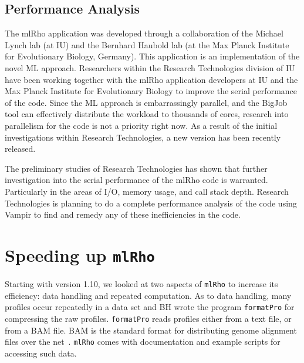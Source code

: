 \documentclass{sig-alternate}
\newcommand{\ty}{\texttt}
\begin{document}
\subsection{Performance Analysis}\label{subsec:analysis}
The mlRho application was developed through a collaboration of the Michael Lynch lab (at IU) and the Bernhard
Haubold lab (at the Max Planck Institute for Evolutionary Biology, Germany). This application is an implementation of
the novel ML approach. Researchers within the Research Technologies division of IU have been working together
with the mlRho application developers at IU and the Max Planck Institute for Evolutionary Biology to improve
the serial performance of the code. Since the ML approach is embarrassingly parallel, and the BigJob tool can
effectively distribute the workload to thousands of cores, research into parallelism for the code is not a priority right now. As a result of the initial investigations within Research Technologies, a new version has been recently released. 

The preliminary studies of Research Technologies has shown that further investigation into the serial
performance of the mlRho code is warranted. Particularly in the areas of I/O, memory usage, and call stack
depth. Research Technologies is planning to do a complete performance analysis of the code using Vampir to
find and remedy any of these inefficiencies in the code. 


\section{Speeding up \ty{mlRho}}
Starting with version 1.10, we looked at two aspects of \ty{mlRho} to
increase its efficiency: data handling and repeated
computation. As to data handling, many profiles occur repeatedly in a
data set and BH wrote the program \ty{formatPro} for compressing the raw
profiles. \ty{formatPro} reads profiles either from a text file, or from a BAM
file. BAM is the standard format for distributing genome alignment
files over the net~\citep{li09:seq}. \ty{mlRho} comes with documentation and example
scripts for accessing such data.
\end{document}
